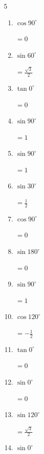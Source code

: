 \begin{multicols}{5}
\begin{enumerate}
  \item $\displaystyle \cos{90^\circ}$

        $\displaystyle =0$

  \item $\displaystyle \sin{60^\circ}$

        $\displaystyle =\frac{\sqrt{3}}{2}$

  \item $\displaystyle \tan{0^\circ}$

        $\displaystyle =0$

  \item $\displaystyle \sin{90^\circ}$

        $\displaystyle =1$

\columnbreak %

  \item $\displaystyle \sin{90^\circ}$

        $\displaystyle =1$

  \item $\displaystyle \sin{30^\circ}$

        $\displaystyle =\frac{1}{2}$

  \item $\displaystyle \cos{90^\circ}$

        $\displaystyle =0$

  \item $\displaystyle \sin{180^\circ}$

        $\displaystyle =0$

  \item $\displaystyle \sin{90^\circ}$

        $\displaystyle =1$

  \item $\displaystyle \cos{120^\circ}$

        $\displaystyle =-\frac{1}{2}$

  \item $\displaystyle \tan{0^\circ}$

        $\displaystyle =0$

  \item $\displaystyle \sin{0^\circ}$

        $\displaystyle =0$

  \item $\displaystyle \sin{120^\circ}$

        $\displaystyle =\frac{\sqrt{3}}{2}$

  \item $\displaystyle \sin{0^\circ}$


\end{enumerate}
\end{multicols}

